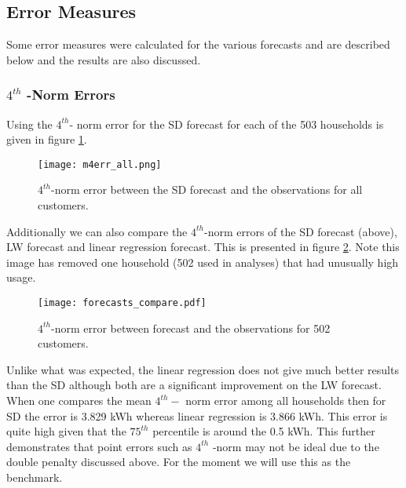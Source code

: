 \documentclass[a4paper]{article}
\begin{document}


\subsection{Error Measures}
\label{subsec:errs}
Some error measures were calculated for the various forecasts and are described below and the results are also discussed.

\subsubsection{$4^{th}$ -Norm Errors} \label{subsubsec:4_err_res}

Using the $4^{th}$- norm error for the SD forecast for each of the 503 households is given in figure \ref{fig:m4e_all}. \newline

\begin{figure}
\centering
\texttt{[image: m4err\_all.png]}
\caption{\label{fig:m4e_all} $4^{th}$-norm error between the SD forecast and the observations for all customers.}
\end{figure}

Additionally we can also compare the $4^{th}$-norm errors of the SD forecast (above), LW forecast and linear regression forecast. This is presented in figure \ref{fig:forecasts_compare}. Note this image has removed one household (502 used in analyses) that had unusually high usage.

\begin{figure}
\texttt{[image: forecasts\_compare.pdf]}
\caption{\label{fig:forecasts_compare} $4^{th}$-norm error between forecast and the observations for 502 customers.}
\end{figure}

Unlike what was expected, the linear regression does not give much better results than the SD although both are a significant improvement on the LW forecast. When one compares the mean $4^{th}-$ norm error among all households then for SD the error is 3.829 kWh whereas linear regression is 3.866 kWh. This error is quite high given that the $75^{th}$ percentile is around the 0.5 kWh. This further demonstrates that point errors such as $4^{th}$ -norm may not be ideal due to the double penalty discussed above. For the moment we will use this as the benchmark.
\end{document}
